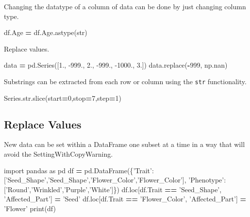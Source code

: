 \documentclass[]{book}
\newenvironment{Shaded}{\begin{snugshade}}{\end{snugshade}}
\newcommand{\BuiltInTok}[1]{#1}
\newcommand{\DecValTok}[1]{\textcolor[rgb]{0.00,0.00,0.81}{#1}}
\newcommand{\FloatTok}[1]{\textcolor[rgb]{0.00,0.00,0.81}{#1}}
\newcommand{\ImportTok}[1]{#1}
\newcommand{\NormalTok}[1]{#1}
\newcommand{\OperatorTok}[1]{\textcolor[rgb]{0.81,0.36,0.00}{\textbf{#1}}}
\newcommand{\StringTok}[1]{\textcolor[rgb]{0.31,0.60,0.02}{#1}}
\begin{document}
Changing the datatype of a column of data can be done by just changing column type.

\begin{Shaded}
\begin{Highlighting}[]
\NormalTok{df.Age }\OperatorTok{=}\NormalTok{ df.Age.astype(}\BuiltInTok{str}\NormalTok{)}
\end{Highlighting}
\end{Shaded}

Replace values.

\begin{Shaded}
\begin{Highlighting}[]
\NormalTok{data }\OperatorTok{=}\NormalTok{ pd.Series([}\FloatTok{1.}\NormalTok{, }\FloatTok{-999.}\NormalTok{, }\FloatTok{2.}\NormalTok{, }\FloatTok{-999.}\NormalTok{, }\FloatTok{-1000.}\NormalTok{, }\FloatTok{3.}\NormalTok{])}
\NormalTok{data.replace(}\OperatorTok{-}\DecValTok{999}\NormalTok{, np.nan)}
\end{Highlighting}
\end{Shaded}

Substrings can be extracted from each row or column using the \texttt{str} functionality.

\begin{Shaded}
\begin{Highlighting}[]
\NormalTok{Series.}\BuiltInTok{str}\NormalTok{.}\BuiltInTok{slice}\NormalTok{(start}\OperatorTok{=}\DecValTok{0}\NormalTok{,stop}\OperatorTok{=}\DecValTok{7}\NormalTok{,step}\OperatorTok{=}\DecValTok{1}\NormalTok{)}
\end{Highlighting}
\end{Shaded}

\hypertarget{replace-values}{%
\subsection{Replace Values}\label{replace-values}}

New data can be set within a DataFrame one subset at a time in a way that will avoid the SettingWithCopyWarning.

\begin{Shaded}
\begin{Highlighting}[]
\ImportTok{import}\NormalTok{ pandas }\ImportTok{as}\NormalTok{ pd}
\NormalTok{df }\OperatorTok{=}\NormalTok{ pd.DataFrame(\{}\StringTok{'Trait'}\NormalTok{:[}\StringTok{'Seed_Shape'}\NormalTok{,}\StringTok{'Seed_Shape'}\NormalTok{,}\StringTok{'Flower_Color'}\NormalTok{,}\StringTok{'Flower_Color'}\NormalTok{],}
                    \StringTok{'Phenotype'}\NormalTok{:[}\StringTok{'Round'}\NormalTok{,}\StringTok{'Wrinkled'}\NormalTok{,}\StringTok{'Purple'}\NormalTok{,}\StringTok{'White'}\NormalTok{]\})}
\NormalTok{df.loc[df.Trait }\OperatorTok{==} \StringTok{'Seed_Shape'}\NormalTok{, }\StringTok{'Affected_Part'}\NormalTok{] }\OperatorTok{=} \StringTok{'Seed'}
\NormalTok{df.loc[df.Trait }\OperatorTok{==} \StringTok{'Flower_Color'}\NormalTok{, }\StringTok{'Affected_Part'}\NormalTok{] }\OperatorTok{=} \StringTok{'Flower'}
\BuiltInTok{print}\NormalTok{(df)}
\end{Highlighting}
\end{Shaded}
\end{document}
